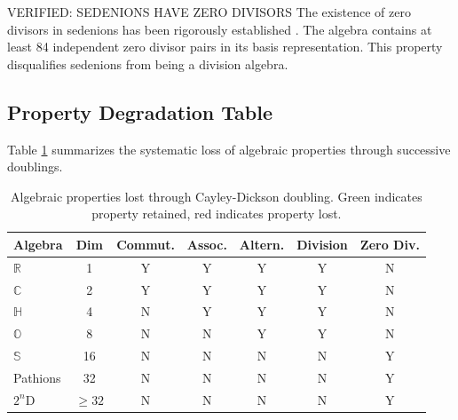 \begin{factcheck}{VERIFIED: SEDENIONS HAVE ZERO DIVISORS}
The existence of zero divisors in sedenions has been rigorously established \cite{cawagas2004sedenions, moreno1998zero}. The algebra contains at least 84 independent zero divisor pairs in its basis representation. This property disqualifies sedenions from being a division algebra.
\end{factcheck}

\subsection{Property Degradation Table}

Table \ref{tab:cayley_dickson_properties} summarizes the systematic loss of algebraic properties through successive doublings.

\begin{table}[h]
\centering
\begin{tabular}{lcccccc}
\toprule
Algebra & Dim & Commut. & Assoc. & Altern. & Division & Zero Div. \\
\midrule
$\mathbb{R}$ & 1 & \textcolor{validcolor}{Y} & \textcolor{validcolor}{Y} & \textcolor{validcolor}{Y} & \textcolor{validcolor}{Y} & \textcolor{validcolor}{N} \\
$\mathbb{C}$ & 2 & \textcolor{validcolor}{Y} & \textcolor{validcolor}{Y} & \textcolor{validcolor}{Y} & \textcolor{validcolor}{Y} & \textcolor{validcolor}{N} \\
$\mathbb{H}$ & 4 & \textcolor{claimcolor}{N} & \textcolor{validcolor}{Y} & \textcolor{validcolor}{Y} & \textcolor{validcolor}{Y} & \textcolor{validcolor}{N} \\
$\mathbb{O}$ & 8 & \textcolor{claimcolor}{N} & \textcolor{claimcolor}{N} & \textcolor{validcolor}{Y} & \textcolor{validcolor}{Y} & \textcolor{validcolor}{N} \\
$\mathbb{S}$ & 16 & \textcolor{claimcolor}{N} & \textcolor{claimcolor}{N} & \textcolor{claimcolor}{N} & \textcolor{claimcolor}{N} & \textcolor{claimcolor}{Y} \\
Pathions & 32 & \textcolor{claimcolor}{N} & \textcolor{claimcolor}{N} & \textcolor{claimcolor}{N} & \textcolor{claimcolor}{N} & \textcolor{claimcolor}{Y} \\
$2^n$D & $\geq 32$ & \textcolor{claimcolor}{N} & \textcolor{claimcolor}{N} & \textcolor{claimcolor}{N} & \textcolor{claimcolor}{N} & \textcolor{claimcolor}{Y} \\
\bottomrule
\end{tabular}
\caption{Algebraic properties lost through Cayley-Dickson doubling. Green indicates property retained, red indicates property lost.}
\label{tab:cayley_dickson_properties}
\end{table}

